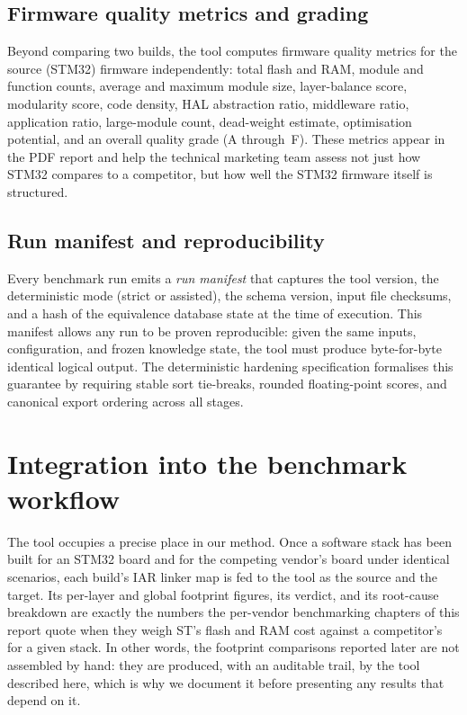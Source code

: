 \subsection{Firmware quality metrics and grading}
\label{sec:tool-quality}

Beyond comparing two builds, the tool computes firmware quality metrics for the source
(STM32) firmware independently: total flash and RAM, module and function counts, average
and maximum module size, layer-balance score, modularity score, code density, HAL
abstraction ratio, middleware ratio, application ratio, large-module count, dead-weight
estimate, optimisation potential, and an overall quality grade (A through~F). These metrics
appear in the PDF report and help the technical marketing team assess not just how STM32
compares to a competitor, but how well the STM32 firmware itself is structured.

\subsection{Run manifest and reproducibility}
\label{sec:tool-manifest}

Every benchmark run emits a \emph{run manifest} that captures the tool version, the
deterministic mode (strict or assisted), the schema version, input file checksums, and a
hash of the equivalence database state at the time of execution. This manifest allows any
run to be proven reproducible: given the same inputs, configuration, and frozen knowledge
state, the tool must produce byte-for-byte identical logical output. The deterministic
hardening specification formalises this guarantee by requiring stable sort tie-breaks,
rounded floating-point scores, and canonical export ordering across all stages.

\section{Integration into the benchmark workflow}
\label{sec:tool-integration}

The tool occupies a precise place in our method. Once a software stack has been built for an
STM32 board and for the competing vendor's board under identical scenarios, each build's IAR
linker map is fed to the tool as the source and the target. Its per-layer and global footprint
figures, its verdict, and its root-cause breakdown are exactly the numbers the per-vendor
benchmarking chapters of this report quote when they weigh ST's flash and RAM cost against a
competitor's for a given stack. In other words, the footprint comparisons reported later are not
assembled by hand: they are produced, with an auditable trail, by the tool described here, which
is why we document it before presenting any results that depend on it.

